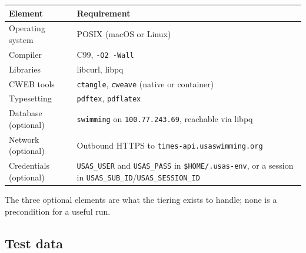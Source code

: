 \documentclass[12pt]{article}
\newcommand{\code}[1]{\texttt{#1}}
\begin{document}
\begin{center}
\begin{tabular}{ll}
  \toprule
  \textbf{Element}        & \textbf{Requirement}                        \\
  \midrule
  Operating system        & POSIX (macOS or Linux)                      \\
  Compiler                & C99, \code{-O2 -Wall}                       \\
  Libraries               & libcurl, libpq                              \\
  CWEB tools              & \code{ctangle}, \code{cweave} (native or container) \\
  Typesetting             & \code{pdftex}, \code{pdflatex}              \\
  Database (optional)     & \code{swimming} on \code{100.77.243.69},
                            reachable via libpq                        \\
  Network (optional)      & Outbound HTTPS to \code{times-api.usaswimming.org} \\
  Credentials (optional)  & \code{USAS\_USER} and \code{USAS\_PASS} in
                            \code{\$HOME/.usas-env}, or a session in
                            \code{USAS\_SUB\_ID}/\code{USAS\_SESSION\_ID} \\
  \bottomrule
\end{tabular}
\end{center}

\noindent The three optional elements are what the tiering exists to
handle; none is a precondition for a useful run.

\subsection{Test data}
\end{document}
